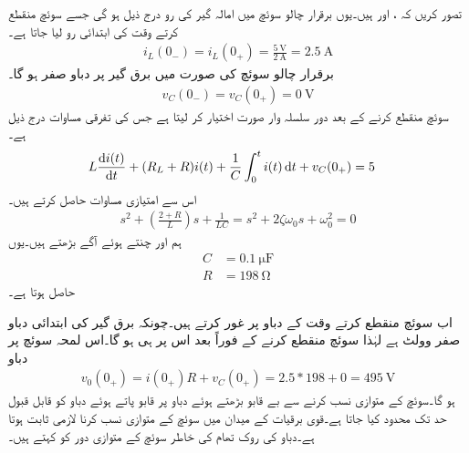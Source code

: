 تصور کریں کہ ،  اور  ہیں۔یوں برقرار چالو سوئچ میں امالہ گیر کی رو درج ذیل ہو گی جسے سوئچ منقطع کرتے وقت کی ابتدائی رو لیا جاتا ہے۔ 
\begin{align*}
i_L(0_-)=i_L(0_+)=\frac{\SI{5}{\volt}}{\SI{2}{\ampere}}=\SI{2.5}{\ampere}
\end{align*} 
برقرار چالو سوئچ کی صورت میں برق گیر پر دباو صفر ہو گا۔
\begin{align*}
v_C(0_-)=v_C(0_+)=\SI{0}{\volt}
\end{align*} 
سوئچ منقطع کرنے کے بعد دور سلسلہ وار  صورت اختیار کر لیتا ہے جس کی تفرقی مساوات درج ذیل ہے۔
\begin{align}\label{مساوات_عارضی_تفرقی_دو_درجی_مثال}
L\frac{\dif i(t)}{\dif t}+(R_L+R) i(t)+\frac{1}{C}\int_{0}^{t} i(t) \dif t+v_C(0_+)&=5
\end{align}
اس سے امتیازی مساوات حاصل کرتے ہیں۔
\begin{align*}
s^2+\left(\frac{2+R}{L}\right)s+\frac{1}{LC}=s^2+2\zeta\omega_0 s+\omega_0^2=0
\end{align*}
ہم  اور  چنتے ہوئے آگے بڑھتے ہیں۔یوں
\begin{align*}
C&=\SI{0.1}{\micro\farad}\\
R&=\SI{198}{\ohm}
\end{align*}
حاصل ہوتا ہے۔

اب سوئچ منقطع کرتے وقت کے دباو پر غور کرتے ہیں۔چونکہ برق گیر کی ابتدائی دباو صفر وولٹ ہے لہٰذا سوئچ منقطع کرنے کے فوراً بعد اس پر  ہی ہو گا۔اس لمحہ سوئچ پر دباو
\begin{align*}
v_0(0_+)=i(0_+)R+v_C(0_+)=2.5*198+0=\SI{495}{\volt}
\end{align*}
ہو گا۔سوئچ کے متوازی  نسب کرنے سے بے قابو بڑھتے ہوئے دباو پر قابو پاتے ہوئے دباو کو قابل قبول حد تک محدود کیا جاتا ہے۔قوی برقیات کے میدان میں سوئچ کے متوازی  نسب کرنا لازمی ثابت ہوتا ہے۔دباو کی روک تھام کی خاطر سوئچ کے متوازی  دور کو  کہتے ہیں۔

